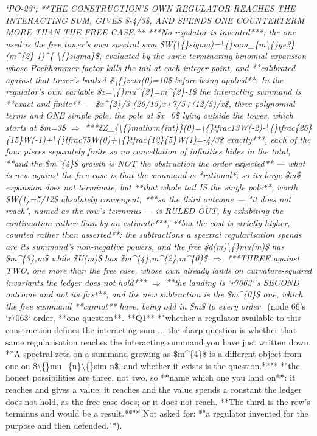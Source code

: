 \begin{description}
\textit{`PO-23`;  **THE CONSTRUCTION'S OWN REGULATOR REACHES THE INTERACTING SUM, GIVES \$-4/3\$, AND SPENDS ONE COUNTERTERM MORE THAN THE FREE CASE.** ***No regulator is invented***: the one used is the free tower's own spectral sum \$W(\textbackslash\{\}sigma)=\textbackslash\{\}sum\_\{m\textbackslash\{\}ge3\}(m\textasciicircum{}\{2\}-1)\textasciicircum{}\{-\textbackslash\{\}sigma\}\$, evaluated by the same terminating binomial expansion whose Pochhammer factor kills the tail at each integer point, and **calibrated against that tower's banked \$\textbackslash\{\}zeta(0)=10\$ before being applied**. In the regulator's own variable \$x=\textbackslash\{\}mu\textasciicircum{}\{2\}=m\textasciicircum{}\{2\}-1\$ the interacting summand is **exact and finite** --- \$x\textasciicircum{}\{2\}/3-(26/15)x+7/5+(12/5)/x\$, three polynomial terms and ONE simple pole, the pole at \$x=0\$ lying outside the tower, which starts at \$m=3\$ \ensuremath{\Rightarrow} ***\$Z\_\{\textbackslash\{\}mathrm\{int\}\}(0)=\textbackslash\{\}tfrac13W(-2)-\textbackslash\{\}tfrac\{26\}\{15\}W(-1)+\textbackslash\{\}tfrac75W(0)+\textbackslash\{\}tfrac\{12\}\{5\}W(1)=-4/3\$ exactly***, each of the four pieces separately finite so no cancellation of infinities hides in the total;  **and the \$m\textasciicircum{}\{4\}\$ growth is NOT the obstruction the order expected** --- what is new against the free case is that the summand is *rational*, so its large-\$m\$ expansion does not terminate, but **that whole tail IS the single pole**, worth \$W(1)=5/12\$ absolutely convergent, ***so the third outcome --- "it does not reach", named as the row's terminus --- is RULED OUT, by exhibiting the continuation rather than by an estimate***;  **but the cost is strictly higher, counted rather than asserted**: the subtractions a spectral regularisation spends are its summand's non-negative powers, and the free \$d(m)\textbackslash\{\}mu(m)\$ has \$m\textasciicircum{}\{3\},m\$ while \$U(m)\$ has \$m\textasciicircum{}\{4\},m\textasciicircum{}\{2\},m\textasciicircum{}\{0\}\$ \ensuremath{\Rightarrow} ***THREE against TWO, one more than the free case, whose own already lands on curvature-squared invariants the ledger does not hold*** \ensuremath{\Rightarrow} **the landing is `r7063`'s SECOND outcome and not its first**;  and the new subtraction is the \$m\textasciicircum{}\{0\}\$ one, which the free summand **cannot** have, being odd in \$m\$ to every order} \ (node 66's `r7063` order, **one question**. **Q1** *"whether a regulator available to this construction defines the interacting sum ... the sharp question is whether that same regularisation reaches the interacting summand you have just written down. **A spectral zeta on a summand growing as \$m\textasciicircum{}\{4\}\$ is a different object from one on \$\textbackslash\{\}mu\_\{n\}\textbackslash\{\}sim n\$, and whether it exists is the question.**"*  *"the honest possibilities are three, not two, so **name which one you land on**: it reaches and gives a value; it reaches and the value spends a constant the ledger does not hold, as the free case does; or it does not reach. **The third is the row's terminus and would be a result.**"* Not asked for: *"a regulator invented for the purpose and then defended."*). 

\end{description}

